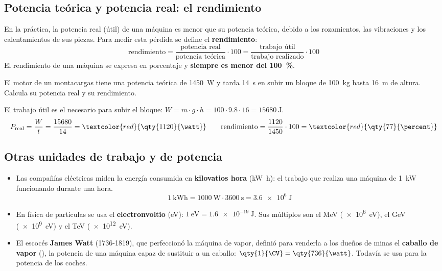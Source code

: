 \subsection{Potencia teórica y potencia real: el rendimiento}

En la práctica, la potencia real (útil) de una máquina es menor que su potencia teórica, debido a los rozamientos, las vibraciones y los calentamientos de sus piezas. Para medir esta pérdida se define el \textbf{rendimiento}:
\[ \text{rendimiento} = \frac{\text{potencia real}}{\text{potencia teórica}} \cdot 100 = \frac{\text{trabajo útil}}{\text{trabajo realizado}} \cdot 100 \]
El rendimiento de una máquina se expresa en porcentaje y \textbf{siempre es menor del \qty{100}{\percent}}.

\begin{example}
    El motor de un montacargas tiene una potencia teórica de \qty{1450}{\watt} y tarda \qty{14}{\s} en subir un bloque de \qty{100}{\kg} hasta \qty{16}{\m} de altura. Calcula su potencia real y su rendimiento.

    El trabajo útil es el necesario para subir el bloque: \(W = m \cdot g \cdot h = 100 \cdot \num{9.8} \cdot 16 = \qty{15680}{\joule}\).
    \[ P_{\text{real}} = \frac{W}{t} = \frac{15680}{14} = \textcolor{red}{\qty{1120}{\watt}} \qquad \text{rendimiento} = \frac{1120}{1450} \cdot 100 = \textcolor{red}{\qty{77}{\percent}} \]
\end{example}

\subsection{Otras unidades de trabajo y de potencia}

\begin{itemize}
    \item Las compañías eléctricas miden la energía consumida en \textbf{kilovatios hora} (\unit{\kilo\watt\hour}): el trabajo que realiza una máquina de \qty{1}{\kilo\watt} funcionando durante una hora.
    \[ \qty{1}{\kilo\watt\hour} = \qty{1000}{\watt} \cdot \qty{3600}{\s} = \qty{3.6e6}{\joule} \]
    \item En física de partículas se usa el \textbf{electronvoltio} (\unit{\electronvolt}): \(\qty{1}{\electronvolt} = \qty{1.6e-19}{\joule}\). Sus múltiplos son el \unit{\mega\electronvolt} (\qty{e6}{\electronvolt}), el \unit{\giga\electronvolt} (\qty{e9}{\electronvolt}) y el \unit{\tera\electronvolt} (\qty{e12}{\electronvolt}).
    \item El escocés \textbf{James Watt} (1736-1819), que perfeccionó la máquina de vapor, definió para venderla a los dueños de minas el \textbf{caballo de vapor} (\unit{\CV}), la potencia de una máquina capaz de sustituir a un caballo: \(\qty{1}{\CV} = \qty{736}{\watt}\). Todavía se usa para la potencia de los coches.
\end{itemize}

